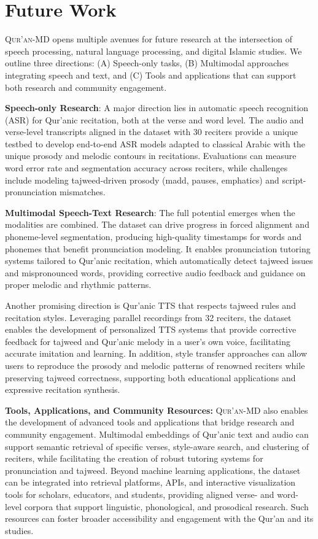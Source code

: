 \section{Future Work}

\textsc{Qur’an-MD} opens multiple avenues for future research at the intersection of speech processing, natural language processing, and digital Islamic studies. We outline three directions: (A) Speech-only tasks, (B) Multimodal approaches integrating speech and text, and (C) Tools and applications that can support both research and community engagement.  

\textbf{Speech-only Research}: A major direction lies in automatic speech recognition (ASR) for Qur’anic recitation, both at the verse and word level. The audio and verse-level transcripts aligned in the dataset with 30 reciters provide a unique testbed to develop end-to-end ASR models adapted to classical Arabic with the unique prosody and melodic contours in recitations. Evaluations can measure word error rate and segmentation accuracy across reciters, while challenges include modeling tajweed-driven prosody (madd, pauses, emphatics) and script-pronunciation mismatches.  

\textbf{Multimodal Speech-Text Research}: The full potential emerges when the modalities are combined. The dataset can drive progress in forced alignment and phoneme-level segmentation, producing high-quality timestamps for words and phonemes that benefit pronunciation modeling. It enables pronunciation tutoring systems tailored to Qur’anic recitation, which automatically detect tajweed issues and mispronounced words, providing corrective audio feedback and guidance on proper melodic and rhythmic patterns.

Another promising direction is Qur’anic TTS that respects tajweed rules and recitation styles. Leveraging parallel recordings from 32 reciters, the dataset enables the development of personalized TTS systems that provide corrective feedback for tajweed and Qur’anic melody in a user’s own voice, facilitating accurate imitation and learning. In addition, style transfer approaches can allow users to reproduce the prosody and melodic patterns of renowned reciters while preserving tajweed correctness, supporting both educational applications and expressive recitation synthesis. 

\textbf{Tools, Applications, and Community Resources:} \textsc{Qur’an-MD} also enables the development of advanced tools and applications that bridge research and community engagement. Multimodal embeddings of Qur’anic text and audio can support semantic retrieval of specific verses, style-aware search, and clustering of reciters, while facilitating the creation of robust tutoring systems for pronunciation and tajweed. Beyond machine learning applications, the dataset can be integrated into retrieval platforms, APIs, and interactive visualization tools for scholars, educators, and students, providing aligned verse- and word-level corpora that support linguistic, phonological, and prosodical research. Such resources can foster broader accessibility and engagement with the Qur'an and its studies.


